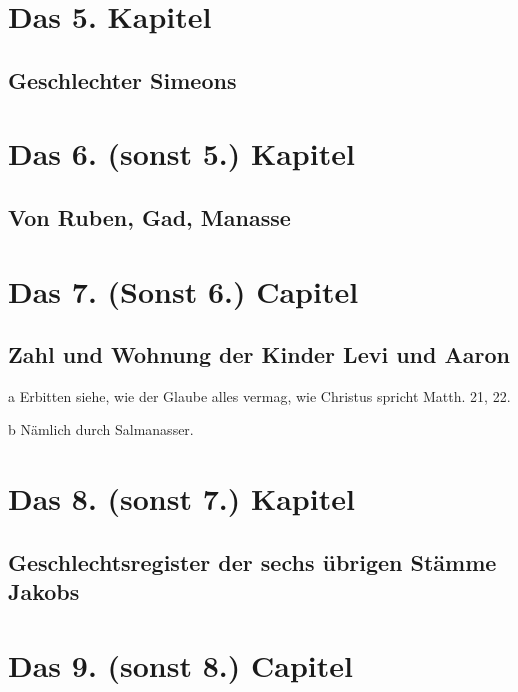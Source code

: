\chapter{Das 5. Kapitel}

\section[Geschlechter Simeons]{Geschlechter Simeons}

\chapter{Das 6. (sonst 5.) Kapitel}

\section[Von Ruben, Gad, Manasse]{Von Ruben, Gad, Manasse}

\chapter{Das 7. (Sonst 6.) Capitel}

\section[Zahl und Wohnung der Kinder Levi und Aaron]{Zahl und Wohnung der Kinder Levi und Aaron}

a Erbitten siehe, wie der Glaube alles vermag, wie Christus spricht Matth. 21, 22.

b Nämlich durch Salmanasser.

\chapter{Das 8. (sonst 7.) Kapitel}

\section[Geschlechtsregister der sechs übrigen Stämme Jakobs]{Geschlechtsregister der sechs übrigen Stämme Jakobs}

\chapter{Das 9. (sonst 8.) Capitel}

